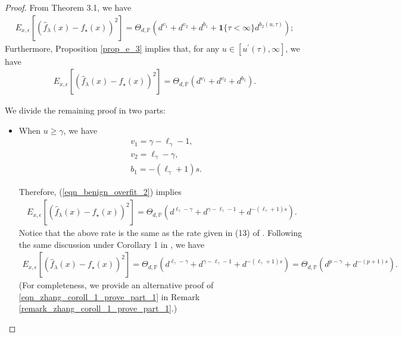 \documentclass{article}
\theoremstyle{plain}
\theoremstyle{definition}
\theoremstyle{remark}
\begin{document}
\begin{appendix}
\begin{proof}
From Theorem 3.1, we have
\begin{equation*}
\begin{aligned}
    E_{x, \epsilon} \left[ \left(\hat{f}_{\lambda}(x) - f_{\star}(x) \right)^{2} \right]
= \Theta_{d, \mathbb{P}} \left( d^{v_1} + d^{v_2} + d^{b_1} + \mathbf{1}\{\tau<\infty\} d^{b_2(u, \tau)}\right);
\end{aligned}
\end{equation*}
Furthermore, Proposition \ref{prop_e_3} implies that, for any $u \in [u^{\prime}(\tau), \infty]$, we have
\begin{equation}\label{eqn_benign_overfit_2}
\begin{aligned}
    E_{x, \epsilon} \left[ \left(\hat{f}_{\lambda}(x) - f_{\star}(x) \right)^{2} \right]
= \Theta_{d, \mathbb{P}} \left( d^{v_1} + d^{v_2} + d^{b_1}\right).
\end{aligned}
\end{equation}









We divide the remaining proof in two parts:
\begin{itemize}
\item When $u \geq \gamma$, we have
    \begin{equation*}
    \begin{aligned}
    &~v_1 =  \gamma - \ell_{\gamma} - 1,\\
    &~v_2 =   \ell_{\gamma} - \gamma,\\
    &~b_1 =  -(\ell_{\gamma} + 1)  s.
    \end{aligned}
\end{equation*}

Therefore, (\ref{eqn_benign_overfit_2}) implies 
\begin{equation}
\begin{aligned}
    E_{x, \epsilon} \left[ \left(\hat{f}_{\lambda}(x) - f_{\star}(x) \right)^{2} \right]
= \Theta_{d, \mathbb{P}} \left( d^{\ell_{\gamma} - \gamma} + d^{\gamma - \ell_{\gamma} - 1} + d^{-(\ell_{\gamma} + 1)  s}\right).
\end{aligned}
\end{equation}
Notice that the above rate is the same as the rate given in (13) of \cite{zhang2024phase}. Following the same discussion under Corollary 1 in \cite{zhang2024phase}, we have 
\begin{equation}\label{eqn_zhang_coroll_1_prove_part_1}
\begin{aligned}
    E_{x, \epsilon} \left[ \left(\hat{f}_{\lambda}(x) - f_{\star}(x) \right)^{2} \right]
= \Theta_{d, \mathbb{P}} \left( d^{\ell_{\gamma} - \gamma} + d^{\gamma - \ell_{\gamma} - 1} + d^{-(\ell_{\gamma} + 1)  s}\right) = \Theta_{d, \mathbb{P}} \left( 
d^{p-\gamma} + 
    d^{-(p+1)s}
\right).
\end{aligned}
\end{equation}
(For completeness, we provide an alternative proof of \eqref{eqn_zhang_coroll_1_prove_part_1} in Remark \ref{remark_zhang_coroll_1_prove_part_1}.)




\end{itemize}
\end{proof}
\end{appendix}
\end{document}
